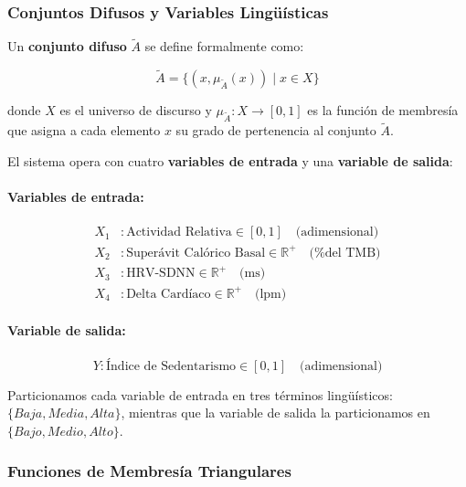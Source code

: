 \subsubsection{Conjuntos Difusos y Variables Lingüísticas}
\label{subsubsec:conjuntos_difusos}

Un \textbf{conjunto difuso} \(\tilde{A}\) se define formalmente como:

\begin{equation}
\tilde{A} = \{(x, \mu_{\tilde{A}}(x)) \mid x \in X\}
\label{eq:conjunto_difuso}
\end{equation}

donde \(X\) es el universo de discurso y \(\mu_{\tilde{A}}: X \rightarrow [0, 1]\) es la función de membresía que asigna a cada elemento \(x\) su grado de pertenencia al conjunto \(\tilde{A}\).

El sistema opera con cuatro \textbf{variables de entrada} y una \textbf{variable de salida}:

\paragraph{Variables de entrada:}
\begin{align}
X_1 &: \text{Actividad Relativa} \in [0, 1] \quad \text{(adimensional)} \label{eq:var_actividad} \\
X_2 &: \text{Superávit Calórico Basal} \in \mathbb{R}^+ \quad \text{(\% del TMB)} \label{eq:var_superavit} \\
X_3 &: \text{HRV-SDNN} \in \mathbb{R}^+ \quad \text{(ms)} \label{eq:var_hrv} \\
X_4 &: \text{Delta Cardíaco} \in \mathbb{R}^+ \quad \text{(lpm)} \label{eq:var_delta}
\end{align}

\paragraph{Variable de salida:}
\begin{equation}
Y: \text{Índice de Sedentarismo} \in [0, 1] \quad \text{(adimensional)}
\label{eq:var_salida}
\end{equation}

Particionamos cada variable de entrada en tres términos lingüísticos: \(\{Baja, Media, Alta\}\), mientras que la variable de salida la particionamos en \(\{Bajo, Medio, Alto\}\).

\subsubsection{Funciones de Membresía Triangulares}
\label{subsubsec:funciones_membresia}

